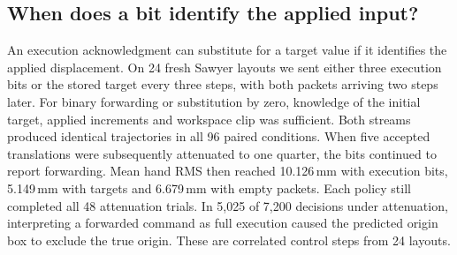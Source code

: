 \subsection{When does a bit identify the applied input?}
An execution acknowledgment can substitute for a target value if it identifies the applied displacement. On 24 fresh Sawyer layouts we sent either three execution bits or the stored target every three steps, with both packets arriving two steps later. For binary forwarding or substitution by zero, knowledge of the initial target, applied increments and workspace clip was sufficient. Both streams produced identical trajectories in all 96 paired conditions. When five accepted translations were subsequently attenuated to one quarter, the bits continued to report forwarding. Mean hand RMS then reached 10.126\,mm with execution bits, 5.149\,mm with targets and 6.679\,mm with empty packets. Each policy still completed all 48 attenuation trials. In 5,025 of 7,200 decisions under attenuation, interpreting a forwarded command as full execution caused the predicted origin box to exclude the true origin. These are correlated control steps from 24 layouts.
